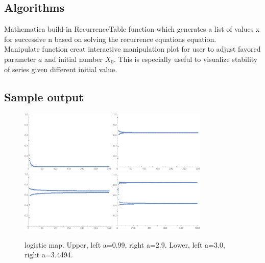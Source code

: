\documentclass[12pt]{article}
\begin{document}
\subsection{Algorithms}
Mathematica build-in RecurrenceTable function which generates a list of values x for successive n based on solving the recurrence equations equation. \\

Manipulate function creat interactive manipulation plot for user to adjust favored parameter $a$ and initial number $X_{0}$. This is especially useful to visualize stability of series given different initial value.

\subsection{Sample output}
\begin{figure}[t!]
	\begin{center}
		\includegraphics[width=0.4\textwidth]{a_09.pdf}
		\includegraphics[width=0.4\textwidth]{a_29.pdf}
		\includegraphics[width=0.4\textwidth]{a_30.pdf}
		\includegraphics[width=0.4\textwidth]{a_3449.pdf}
		\caption{logistic map. Upper, left a=0.99, right a=2.9. Lower, left a=3.0, right a=3.4494.}
	\end{center}
\end{figure}
\end{document}
